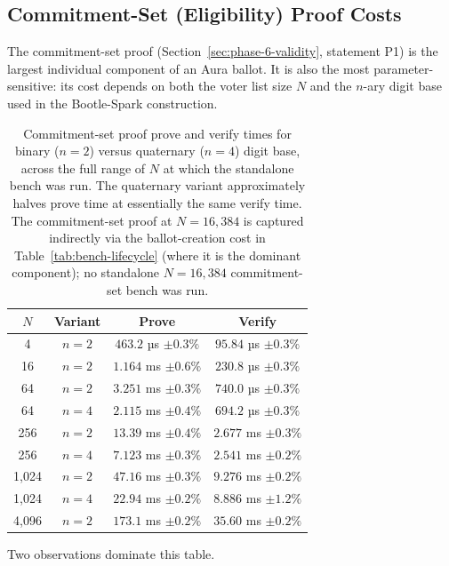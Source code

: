 \documentclass[12pt,a4paper,oneside]{report}
\begin{document}
\subsection{Commitment-Set (Eligibility) Proof Costs}
\label{sec:bench-commset}

The commitment-set proof (Section~\ref{sec:phase-6-validity}, statement 
P1) is the largest individual component of an Aura ballot. It is also 
the most parameter-sensitive: its cost depends on both the voter list 
size $N$ and the $n$-ary digit base used in the Bootle-Spark construction.

\begin{table}[H]
\centering
\caption{Commitment-set proof prove and verify times for binary
($n = 2$) versus quaternary ($n = 4$) digit base, across the full
range of $N$ at which the standalone bench was run. The quaternary
variant approximately halves prove time at essentially the same
verify time. The commitment-set proof at $N = 16{,}384$ is captured
indirectly via the ballot-creation cost in
Table~\ref{tab:bench-lifecycle} (where it is the dominant component);
no standalone $N = 16{,}384$ commitment-set bench was run.}
\label{tab:bench-commset}
\small
\begin{tabular}{cccc}
\toprule
$N$ & Variant & Prove & Verify \\
\midrule
4      & $n = 2$ & $463.2$ µs $\pm 0.3\%$ & $95.84$ µs $\pm 0.3\%$ \\
16     & $n = 2$ & $1.164$ ms $\pm 0.6\%$ & $230.8$ µs $\pm 0.3\%$ \\
64     & $n = 2$ & $3.251$ ms $\pm 0.3\%$ & $740.0$ µs $\pm 0.3\%$ \\
64     & $n = 4$ & $2.115$ ms $\pm 0.4\%$ & $694.2$ µs $\pm 0.3\%$ \\
256    & $n = 2$ & $13.39$ ms $\pm 0.4\%$ & $2.677$ ms $\pm 0.3\%$ \\
256    & $n = 4$ & $7.123$ ms $\pm 0.3\%$ & $2.541$ ms $\pm 0.2\%$ \\
1{,}024  & $n = 2$ & $47.16$ ms $\pm 0.3\%$ & $9.276$ ms $\pm 0.2\%$ \\
1{,}024  & $n = 4$ & $22.94$ ms $\pm 0.2\%$ & $8.886$ ms $\pm 1.2\%$ \\
4{,}096  & $n = 2$ & $173.1$ ms $\pm 0.2\%$ & $35.60$ ms $\pm 0.2\%$ \\
\bottomrule
\end{tabular}
\end{table}

Two observations dominate this table.
\end{document}
